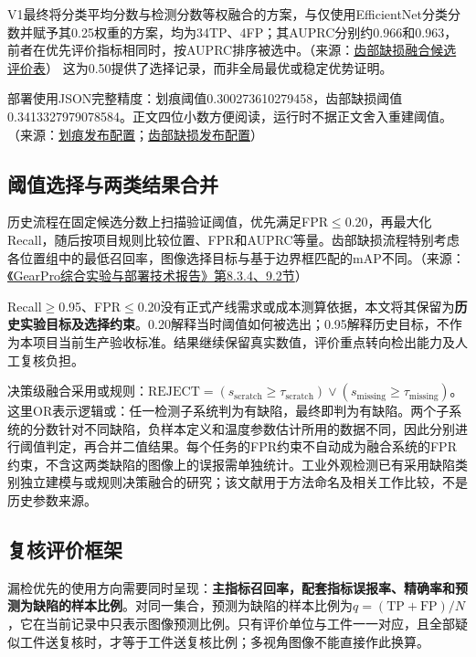 V1最终将分类平均分数与检测分数等权融合的方案，与仅使用EfficientNet分类分数并赋予其0.25权重的方案，均为34TP、4FP；其AUPRC分别约0.966和0.963，前者在优先评价指标相同时，按AUPRC排序被选中。（来源：\protect\hyperlink{source-9}{齿部缺损融合候选评价表}） 这为0.50提供了选择记录，而非全局最优或稳定优势证明。

部署使用JSON完整精度：划痕阈值0.300273610279458，齿部缺损阈值0.3413327979078584。正文四位小数方便阅读，运行时不据正文舍入重建阈值。（来源：\protect\hyperlink{source-1}{划痕发布配置}；\protect\hyperlink{source-2}{齿部缺损发布配置}）

\FloatBarrier{}\subsection{阈值选择与两类结果合并}
历史流程在固定候选分数上扫描验证阈值，优先满足FPR\ensuremath{\leq}0.20，再最大化Recall，随后按项目规则比较位置、FPR和AUPRC等量。齿部缺损流程特别考虑各位置组中的最低召回率，图像选择目标与基于边界框匹配的mAP不同。（来源：\protect\href{run:../GearPro_综合技术报告_Markdown含配图/GearPro_综合实验与部署技术报告.md}{《GearPro综合实验与部署技术报告》第8.3.4、9.2节}）

Recall\ensuremath{\geq}0.95、FPR\ensuremath{\leq}0.20没有正式产线需求或成本测算依据，本文将其保留为\textbf{历史实验目标及选择约束}。0.20解释当时阈值如何被选出；0.95解释历史目标，不作为本项目当前生产验收标准。结果继续保留真实数值，评价重点转向检出能力及人工复核负担。

决策级融合采用或规则：$\mathrm{REJECT}=(s_{\mathrm{scratch}}\geq\tau_{\mathrm{scratch}})\lor(s_{\mathrm{missing}}\geq\tau_{\mathrm{missing}})$。这里OR表示逻辑或：任一检测子系统判为有缺陷，最终即判为有缺陷。两个子系统的分数针对不同缺陷，负样本定义和温度参数估计所用的数据不同，因此分别进行阈值判定，再合并二值结果。每个任务的FPR约束不自动成为融合系统的FPR约束，不含这两类缺陷的图像上的误报需单独统计。工业外观检测已有采用缺陷类别独立建模与或规则决策融合的研究\cite{ref15}；该文献用于方法命名及相关工作比较，不是历史参数来源。

\FloatBarrier{}\subsection{复核评价框架}
漏检优先的使用方向需要同时呈现：\textbf{主指标召回率，配套指标误报率、精确率和预测为缺陷的样本比例}。对同一集合，预测为缺陷的样本比例为$q=(\mathrm{TP}+\mathrm{FP})/N$，它在当前记录中只表示图像预测比例。只有评价单位与工件一一对应，且全部疑似工件送复核时，才等于工件送复核比例；多视角图像不能直接作此换算。


